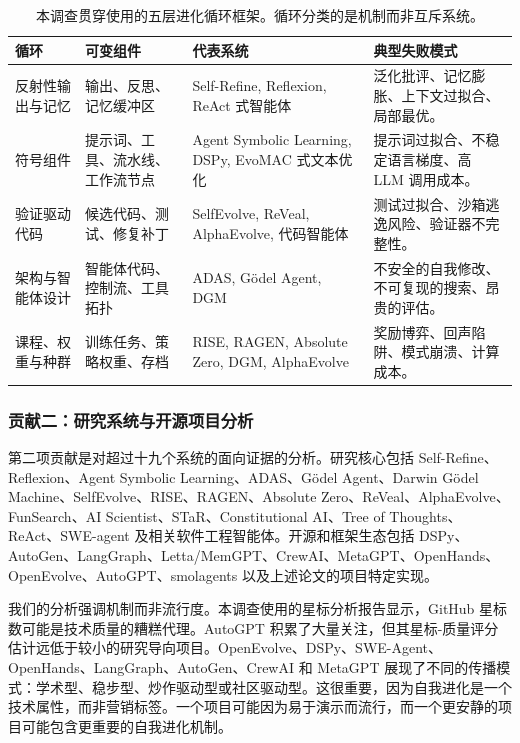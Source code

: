 \begin{table}[t]
\centering
{\TableTight
\begin{tabularx}{\textwidth}{@{}L{0.18\textwidth}L{0.19\textwidth}L{0.25\textwidth}Y@{}}
\toprule
\textbf{循环} & \textbf{可变组件} & \textbf{代表系统} & \textbf{典型失败模式} \\
 \midrule
反射性输出与记忆 & 输出、反思、记忆缓冲区 & Self-Refine, Reflexion, ReAct 式智能体 & 泛化批评、记忆膨胀、上下文过拟合、局部最优。 \\
符号组件 & 提示词、工具、流水线、工作流节点 & Agent Symbolic Learning, DSPy, EvoMAC 式文本优化 & 提示词过拟合、不稳定语言梯度、高 LLM 调用成本。 \\
验证驱动代码 & 候选代码、测试、修复补丁 & SelfEvolve, ReVeal, AlphaEvolve, 代码智能体 & 测试过拟合、沙箱逃逸风险、验证器不完整性。 \\
架构与智能体设计 & 智能体代码、控制流、工具拓扑 & ADAS, G{\"o}del Agent, DGM & 不安全的自我修改、不可复现的搜索、昂贵的评估。 \\
课程、权重与种群 & 训练任务、策略权重、存档 & RISE, RAGEN, Absolute Zero, DGM, AlphaEvolve & 奖励博弈、回声陷阱、模式崩溃、计算成本。 \\
\bottomrule
\end{tabularx}}
\caption{本调查贯穿使用的五层进化循环框架。循环分类的是机制而非互斥系统。}
\label{tab:five-loops}
\end{table}

\subsubsection{贡献二：研究系统与开源项目分析}

第二项贡献是对超过十九个系统的面向证据的分析。研究核心包括 Self-Refine、Reflexion、Agent Symbolic Learning、ADAS、G{\"o}del Agent、Darwin G{\"o}del Machine、SelfEvolve、RISE、RAGEN、Absolute Zero、ReVeal、AlphaEvolve、FunSearch、AI Scientist、STaR、Constitutional AI、Tree of Thoughts、ReAct、SWE-agent \cite{sweagent2024} 及相关软件工程智能体。开源和框架生态包括 DSPy、AutoGen、LangGraph、Letta/MemGPT、CrewAI、MetaGPT、OpenHands、OpenEvolve、AutoGPT、smolagents 以及上述论文的项目特定实现。

我们的分析强调机制而非流行度。本调查使用的星标分析报告显示，GitHub 星标数可能是技术质量的糟糕代理。AutoGPT 积累了大量关注，但其星标-质量评分估计远低于较小的研究导向项目。OpenEvolve、DSPy、SWE-Agent、OpenHands、LangGraph、AutoGen、CrewAI 和 MetaGPT 展现了不同的传播模式：学术型、稳步型、炒作驱动型或社区驱动型。这很重要，因为自我进化是一个技术属性，而非营销标签。一个项目可能因为易于演示而流行，而一个更安静的项目可能包含更重要的自我进化机制。

